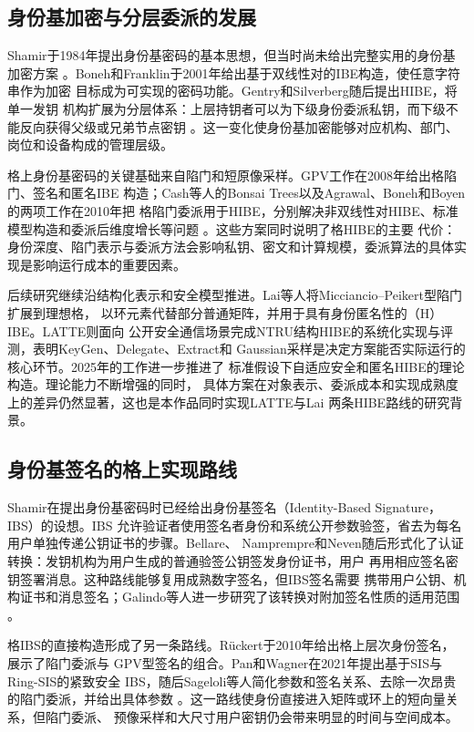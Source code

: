\subsection{身份基加密与分层委派的发展}

Shamir于1984年提出身份基密码的基本思想，但当时尚未给出完整实用的身份基加密方案
\cite{shamir1984}。Boneh和Franklin于2001年给出基于双线性对的IBE构造，使任意字符串作为加密
目标成为可实现的密码功能\cite{bonehfranklin2003}。Gentry和Silverberg随后提出HIBE，将单一发钥
机构扩展为分层体系：上层持钥者可以为下级身份委派私钥，而下级不能反向获得父级或兄弟节点密钥
\cite{gentrysilverberg2002}。这一变化使身份基加密能够对应机构、部门、岗位和设备构成的管理层级。

格上身份基密码的关键基础来自陷门和短原像采样。GPV工作在2008年给出格陷门、签名和匿名IBE
构造\cite{gpv2008}；Cash等人的Bonsai Trees以及Agrawal、Boneh和Boyen的两项工作在2010年把
格陷门委派用于HIBE，分别解决非双线性对HIBE、标准模型构造和委派后维度增长等问题
\cite{cash2010bonsai,agrawal2010hibe,agrawal2010delegation}。这些方案同时说明了格HIBE的主要
代价：身份深度、陷门表示与委派方法会影响私钥、密文和计算规模，委派算法的具体实现是影响运行成本的重要因素。

后续研究继续沿结构化表示和安全模型推进。Lai等人将Micciancio--Peikert型陷门扩展到理想格，
以环元素代替部分普通矩阵，并用于具有身份匿名性的（H）IBE\cite{lai2015trapdoors}。LATTE则面向
公开安全通信场景完成NTRU结构HIBE的系统化实现与评测，表明KeyGen、Delegate、Extract和
Gaussian采样是决定方案能否实际运行的核心环节\cite{zhao2024latte}。2025年的工作进一步推进了
标准假设下自适应安全和匿名HIBE的理论构造\cite{goyal2025adaptivehibe}。理论能力不断增强的同时，
具体方案在对象表示、委派成本和实现成熟度上的差异仍然显著，这也是本作品同时实现LATTE与Lai
两条HIBE路线的研究背景。

\subsection{身份基签名的格上实现路线}

Shamir在提出身份基密码时已经给出身份基签名（Identity-Based Signature，IBS）的设想。IBS
允许验证者使用签名者身份和系统公开参数验签，省去为每名用户单独传递公钥证书的步骤。Bellare、
Namprempre和Neven随后形式化了认证转换：发钥机构为用户生成的普通验签公钥签发身份证书，用户
再用相应签名密钥签署消息\cite{bellare2004ibs}。这种路线能够复用成熟数字签名，但IBS签名需要
携带用户公钥、机构证书和消息签名；Galindo等人进一步研究了该转换对附加签名性质的适用范围
\cite{galindo2006ibs}。

格IBS的直接构造形成了另一条路线。Rückert于2010年给出格上层次身份签名，展示了陷门委派与
GPV型签名的组合\cite{ruckert2010hibs}。Pan和Wagner在2021年提出基于SIS与Ring-SIS的紧致安全
IBS，随后Sageloli等人简化参数和签名关系、去除一次昂贵的陷门委派，并给出具体参数
\cite{pan2021ibs,sageloli2023ibs}。这一路线使身份直接进入矩阵或环上的短向量关系，但陷门委派、
预像采样和大尺寸用户密钥仍会带来明显的时间与空间成本。

